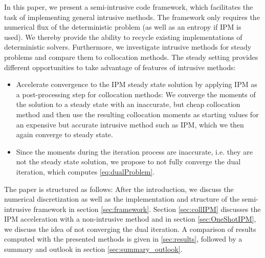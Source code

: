 In this paper, we present a semi-intrusive code framework, which facilitates the task of implementing general intrusive methods. The framework only requires the numerical flux of the deterministic problem (as well as an entropy if IPM is used). We thereby provide the ability to recycle existing implementations of deterministic solvers.
Furthermore, we investigate intrusive methods for steady problems and compare them to collocation methods. The steady setting provides different opportunities to take advantage of features of intrusive methods: 
\begin{itemize}
\item Accelerate convergence to the IPM steady state solution by applying IPM as a post-processing step for collocation methods: We converge the moments of the solution to a steady state with an inaccurate, but cheap collocation method and then use the resulting collocation moments as starting values for an expensive but accurate intrusive method such as IPM, which we then again converge to steady state. 
\item Since the moments during the iteration process are inaccurate, i.e. they are not the steady state solution, we propose to not fully converge the dual iteration, which computes \eqref{eq:dualProblem}. 
\end{itemize}

The paper is structured as follows: After the introduction, we discuss the numerical discretization as well as the implementation and structure of the semi-intrusive framework in section \ref{sec:framework}. Section \ref{sec:collIPM} discusses the IPM acceleration with a non-intrusive method and in section \ref{sec:OneShotIPM}, we discuss the idea of not converging the dual iteration. A comparison of results computed with the presented methods is given in \ref{sec:results}, followed by a summary and outlook in section \ref{sec:summary_outlook}.

